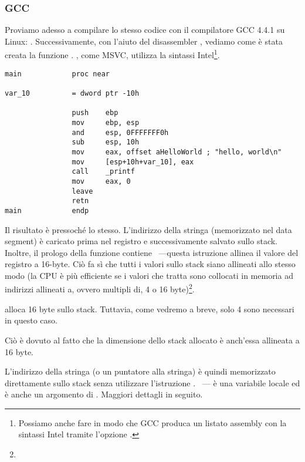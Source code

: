 \subsubsection{GCC}

Proviamo adesso a compilare lo stesso codice \CCpp con il compilatore GCC 4.4.1 su Linux: .
Successivamente, con l'aiuto del disassembler \IDA, vediamo come è stata creata la funzione \main .
\IDA, come MSVC, utilizza la sintassi Intel\footnote{Possiamo anche fare in modo che GCC produca un listato assembly con la sintassi Intel tramite l'opzione .}.

\begin{lstlisting}[caption=codice in \IDA,style=customasmx86]
main            proc near

var_10          = dword ptr -10h

                push    ebp
                mov     ebp, esp
                and     esp, 0FFFFFFF0h
                sub     esp, 10h
                mov     eax, offset aHelloWorld ; "hello, world\n"
                mov     [esp+10h+var_10], eax
                call    _printf
                mov     eax, 0
                leave
                retn
main            endp
\end{lstlisting}

Il risultato è pressoché lo stesso.
L'indirizzo della stringa  (memorizzato nel data segment) è caricato prima nel registro \EAX e successivamente salvato sullo stack.
Inoltre, il prologo della funzione contiene ~---questa 
istruzione allinea il valore del registro \ESP a 16-byte.
Ciò fa sì che tutti i valori sullo stack siano allineati allo stesso modo (la CPU è più efficiente se i valori che tratta sono collocati in memoria ad indirizzi allineati a, ovvero multipli di, 4 o 16 byte)\footnote{\URLWPDA}.

 alloca 16 byte sullo stack. Tuttavia, come vedremo a breve, solo 4 sono necessari in questo caso.

Ciò è dovuto al fatto che la dimensione dello stack allocato è anch'essa allineata a 16 byte.

L'indirizzo della stringa (o un puntatore alla stringa) è quindi memorizzato direttamente sullo stack senza utilizzare l'istruzione \PUSH .
~--- è una variabile locale ed è anche un argomento di \printf{}.
Maggiori dettagli in seguito.

